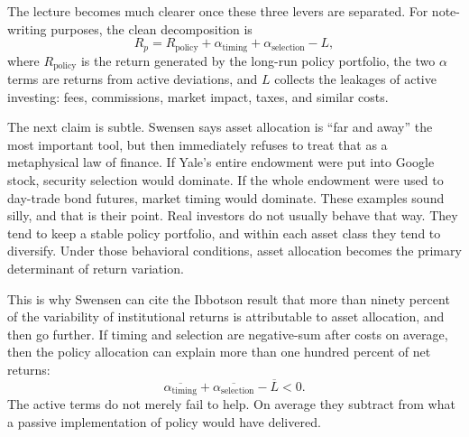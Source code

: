 The lecture becomes much clearer once these three levers are separated. For note-writing purposes, the clean decomposition is
\begin{equation}
R_p = R_{\text{policy}} + \alpha_{\text{timing}} + \alpha_{\text{selection}} - L,
\end{equation}
where \(R_{\text{policy}}\) is the return generated by the long-run policy portfolio, the two \(\alpha\) terms are returns from active deviations, and \(L\) collects the leakages of active investing: fees, commissions, market impact, taxes, and similar costs.

\begin{figure}[h]
\centering
{}
\end{figure}

The next claim is subtle. Swensen says asset allocation is ``far and away'' the most important tool, but then immediately refuses to treat that as a metaphysical law of finance. If Yale's entire endowment were put into Google stock, security selection would dominate. If the whole endowment were used to day-trade bond futures, market timing would dominate. These examples sound silly, and that is their point. Real investors do not usually behave that way. They tend to keep a stable policy portfolio, and within each asset class they tend to diversify. Under those behavioral conditions, asset allocation becomes the primary determinant of return variation.

This is why Swensen can cite the Ibbotson result that more than ninety percent of the variability of institutional returns is attributable to asset allocation, and then go further. If timing and selection are negative-sum after costs on average, then the policy allocation can explain more than one hundred percent of net returns:
\begin{equation}
\overline{\alpha_{\text{timing}}}+\overline{\alpha_{\text{selection}}}-\overline{L}<0.
\end{equation}
The active terms do not merely fail to help. On average they subtract from what a passive implementation of policy would have delivered.


